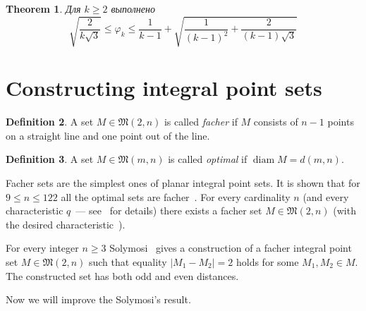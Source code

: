\documentclass[a4paper,14pt]{article} %
\theoremstyle{plain}
\newtheorem{theorem}{Theorem}[section]
\theoremstyle{definition}
\newtheorem{definition}[theorem]{Definition}
\begin{document}
\begin{theorem}%
	\label{thm:varphi_k_bounds}
	\cite{costa2013valid}
	Для $k\geq 2$ выполнено
	\begin{equation*}
		\sqrt{\frac{2}{k\sqrt{3}}}
		\leq
		\varphi_k
		\leq
		\frac{1}{k-1} +
		\sqrt{
			\frac{1}{(k-1)^2}
			+
			\frac{2}{(k-1)\sqrt{3}}
		}
	\end{equation*}
\end{theorem}



\section{Constructing integral point sets}

\begin{definition}
	A set $M\in\mathfrak{M}(2,n)$ is called \textit{facher}
	if $M$ consists of $n-1$ points on a straight line
	and one point out of the line.
\end{definition}

\begin{definition}
	A set $M\in\mathfrak{M}(m,n)$ is called \textit{optimal}
	if $\operatorname{diam}M=d(m,n)$.
\end{definition}


Facher sets are the simplest ones of planar integral point sets.
It is shown that for $9\leq n \leq 122$ all the optimal sets are facher~\cite{kurz2008minimum}.
For every cardinality $n$ (and every characteristic $q$~--- see~\cite{kurz2005characteristic} for details)
there exists a facher set $M\in\mathfrak{M}(2,n)$ (with the desired characteristic~\cite[Theorem 5]{our-vmmsh-2018}).

For every integer $n\geq 3$ Solymosi~\cite{solymosi2003note} gives a construction of a facher integral point set
$M\in\mathfrak{M}(2,n)$
such that equality $|M_1 - M_2| = 2$ holds for some $M_1, M_2 \in M$.
The constructed set has both odd and even distances.

Now we will improve the Solymosi's result.
\end{document}
